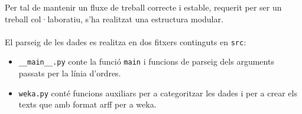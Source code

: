 
Per tal de mantenir un fluxe de treball correcte i estable, requerit per ser un treball col·laboratiu, s'ha realitzat una estructura modular.\\
\\
El parseig de les dades es realitza en dos fitxers continguts en \texttt{src}:
\begin{itemize}
	\item \verb|__main__.py| conte la funció \texttt{main} i funcions de parseig dels
	arguments passats per la línia d'ordres.
	\item \texttt{weka.py} conté funcions auxiliars per a categoritzar les dades i per a crear els
	texts que amb format arff per a weka.
\end{itemize}
